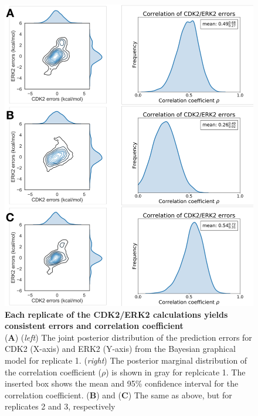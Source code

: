 \documentclass[9pt,lineno]{elife-modified} %
\begin{document}
\begin{figure}[h]
	\begin{fullwidth}
		\begin{centering}
			\includegraphics[width=1.0\linewidth]{figures/supp_figure7.pdf}
		\end{centering}
		\caption{
			\label{fig:sup-figure-7}
			{\bf Each replicate of the CDK2/ERK2 calculations yields consistent errors and correlation coefficient} \\
			({\bf A}) (\emph{left}) The joint posterior distribution of the prediction errors for CDK2 (X-axis) and ERK2 (Y-axis) from the Bayesian graphical model for replicate 1. (\emph{right}) The posterior marginal distribution of the correlation coefficient ($\rho$) is shown in gray for replcicate 1. The inserted box shows the mean and 95\% confidence interval for the correlation coefficient. ({\bf B}) and ({\bf C}) The same as above, but for replicates 2 and 3, respectively
		}
	\end{fullwidth}
\end{figure}
\end{document}
